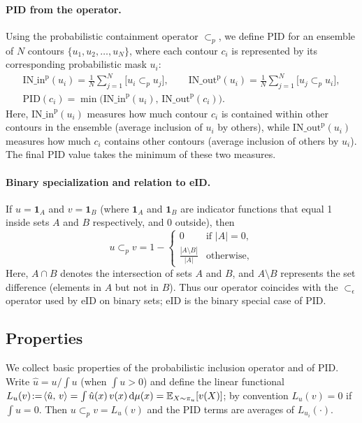 \documentclass[review,journal]{vgtc}              %
\begin{document}
\paragraph{PID from the operator.}
Using the probabilistic containment operator $\subset_{\!p}$, we define PID for an ensemble of $N$ contours $\{u_1, u_2, \ldots, u_N\}$, where each contour $c_i$ is represented by its corresponding probabilistic mask $u_i$:
\begin{gather}
\mathrm{IN\_in}^{\mathrm{p}}(u_i)=\frac1N\sum_{j=1}^{N}\!\bigl[u_i\subset_{\!p}u_j\bigr],\qquad
\mathrm{IN\_out}^{\mathrm{p}}(u_i)=\frac1N\sum_{j=1}^{N}\!\bigl[u_j\subset_{\!p}u_i\bigr],\\[2pt]
\mathrm{PID}(c_i)=\min\!\bigl(\mathrm{IN\_in}^{\mathrm{p}}(u_i),\,\mathrm{IN\_out}^{\mathrm{p}}(c_i)\bigr).
\label{eq:pid}
\end{gather}
Here, $\mathrm{IN\_in}^{\mathrm{p}}(u_i)$ measures how much contour $c_i$ is contained within other contours in the ensemble (average inclusion of $u_i$ by others), while $\mathrm{IN\_out}^{\mathrm{p}}(u_i)$ measures how much $c_i$ contains other contours (average inclusion of others by $u_i$). The final PID value takes the minimum of these two measures.

\paragraph{Binary specialization and relation to eID.}
If $u=\mathbf{1}_A$ and $v=\mathbf{1}_B$ (where $\mathbf{1}_A$ and $\mathbf{1}_B$ are indicator functions that equal 1 inside sets $A$ and $B$ respectively, and 0 outside), then
\begin{equation}
u\subset_{\!p}v = 1 - 
\begin{cases} 
0 & \text{if } |A| = 0, \\
\frac{|A \setminus B|}{|A|} & \text{otherwise},
\end{cases}
\end{equation}
Here, $A\cap B$ denotes the intersection of sets $A$ and $B$, and $A\setminus B$ represents the set difference (elements in $A$ but not in $B$). Thus our operator coincides with the $\subset_\epsilon$ operator used by eID on binary sets; eID is the binary special case of PID.



\subsection{Properties}
We collect basic properties of the probabilistic inclusion operator and of PID. 
Write $\hat u = u/\!\int u$ (when $\int u>0$) and define the linear functional
$L_u(v)\!:=\!\langle \hat u,\,v\rangle=\int \hat u(x)\,v(x)\,{\rm d}\mu(x)
=\mathbb{E}_{X\sim\pi_u}[v(X)]$; by convention $L_u(v)=0$ if $\int u=0$.
Then $u\subset_{\!p}v=L_u(v)$ and the PID terms are averages of $L_{u_i}(\cdot)$.
\end{document}
